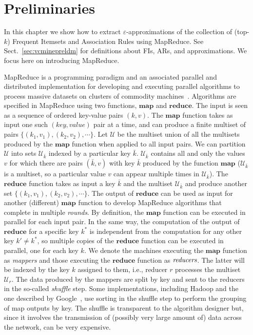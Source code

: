 \section{Preliminaries}
\label{sec:parmadef}
In this chapter we show how to extract $\varepsilon$-approximations of the
collection of (top-$k$) Frequent Itemsets and Association Rules using MapReduce. See
Sect.~\ref{sec:vcminepreldm} for definitions about FIs, ARs, and approximations.
We focus here on introducing MapReduce.

MapReduce is a programming paradigm and an associated parallel
and distributed implementation for developing and executing parallel algorithms
to process massive datasets on clusters of commodity machines~\citep{DeanG08}.
Algorithms are specified in MapReduce using two functions, $\mathbf{map}$ and
$\mathbf{reduce}$. The input is seen as a sequence of ordered key-value pairs
$(k,v)$. The $\mathbf{map}$ function takes as input one such $(key,value)$ pair
at a time, and can produce a finite multiset of pairs
$\{(k_1,v_1),(k_2,v_2),\cdots\}$. Let $\mathcal{U}$ be the multiset
union of all the multisets produced by the $\mathbf{map}$ function when applied
to all input pairs. We can partition $\mathcal{U}$ into sets
$\mathcal{U}_{\bar{k}}$ indexed by a particular key $\bar{k}$.
$\mathcal{U}_{\bar{k}}$ contains all and only the values $v$ for which there are pairs
$(\bar{k},v)$ with key $\bar{k}$ produced by the function $\mathbf{map}$
($\mathcal{U}_{\bar{k}}$ is a multiset, so a particular value $v$ can appear
multiple times in $\mathcal{U}_{\bar{k}}$). The $\mathbf{reduce}$ function takes as
input a key $\bar{k}$ and the multiset $\mathcal{U}_{\bar{k}}$ and produce another set
$\{(k_1,v_1),(k_2,v_2),\cdots\}$. 
The output of $\mathbf{reduce}$ can be used as
input for another (different) $\mathbf{map}$ function to develop MapReduce
algorithms that complete in multiple \emph{rounds}. 
By definition, the $\mathbf{map}$ function can be executed in parallel for each
input pair. In the same way, the computation of the output of $\mathbf{reduce}$
for a specific key $k^*$ is independent from the computation for any other key $k'\neq
k^*$, so multiple copies of the $\mathbf{reduce}$ function can be executed
in parallel, one for each key $k$. We denote the machines executing the
$\mathbf{map}$ function as \emph{mappers} and those executing the
$\mathbf{reduce}$ function as $\emph{reducers}$. The latter will be indexed by
the key $k$ assigned to them, i.e., reducer $r$ processes the multiset
$\mathcal{U}_r$. The data produced by the mappers are split by key and
sent to the reducers in the so-called \emph{shuffle} step. Some implementations, 
including Hadoop and the one described by Google~\citep{DeanG08}, use sorting in
the shuffle step to perform the grouping of map outputs by key.
The shuffle is transparent
to the algorithm designer but, since it involves the transmission of (possibly very
large amount of) data across the network, can be very expensive.

